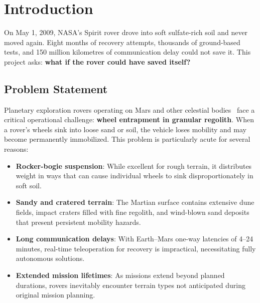 \documentclass[12pt,a4paper]{article}
\begin{document}
\newpage
\tableofcontents

\newpage
\listoffigures
\listoftables

\newpage
\section{Introduction}

\begin{tcolorbox}[
    enhanced, colback=white, colframe=headerblue,
    boxrule=0.8pt, arc=5pt,
    left=12pt, right=12pt, top=8pt, bottom=8pt
]
{\color{black!60} On May 1, 2009, NASA's Spirit rover drove into soft sulfate-rich soil and
never moved again. Eight months of recovery attempts, thousands of ground-based
tests, and 150 million kilometres of communication delay could not save it.
This project asks: \textbf{what if the rover could have saved itself?}}
\end{tcolorbox}

\vspace{8pt}

\subsection{Problem Statement}

Planetary exploration rovers operating on Mars and other celestial bodies~\cite{squyres2004mer,grotzinger2012msl,farley2020mars2020} face a critical operational challenge: \textbf{wheel entrapment in granular regolith}. When a rover's wheels sink into loose sand or soil, the vehicle loses mobility and may become permanently immobilized. This problem is particularly acute for several reasons:

\begin{itemize}[leftmargin=*, itemsep=3pt]
    \item \textbf{Rocker-bogie suspension}: While excellent for rough terrain, it distributes weight in ways that can cause individual wheels to sink disproportionately in soft soil.
    \item \textbf{Sandy and cratered terrain}: The Martian surface contains extensive dune fields, impact craters filled with fine regolith, and wind-blown sand deposits that present persistent mobility hazards.
    \item \textbf{Long communication delays}: With Earth--Mars one-way latencies of 4--24 minutes, real-time teleoperation for recovery is impractical, necessitating fully autonomous solutions.
    \item \textbf{Extended mission lifetimes}: As missions extend beyond planned durations, rovers inevitably encounter terrain types not anticipated during original mission planning.
\end{itemize}
\end{document}
